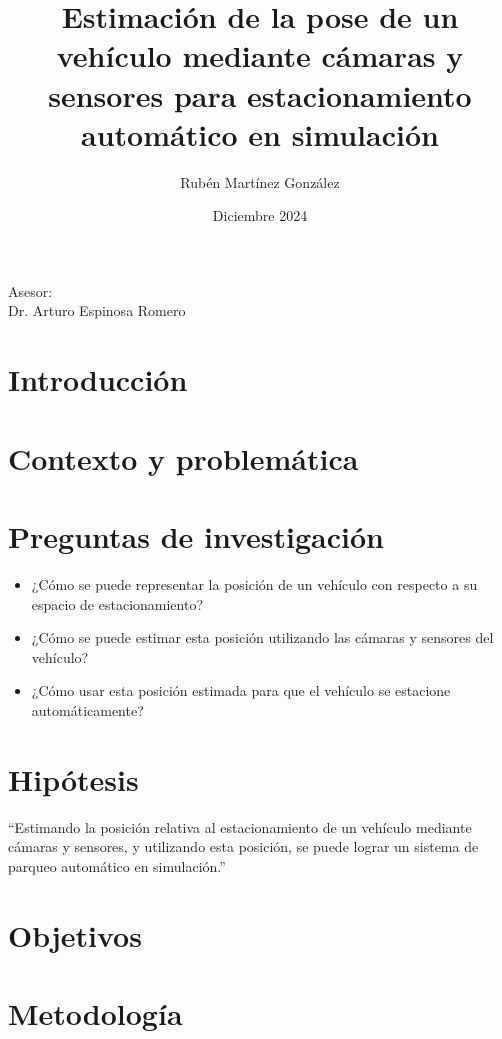 \documentclass[11pt,letterpaper,final]{article}
\title{Estimación de la pose de un vehículo mediante cámaras y sensores para estacionamiento automático en simulación}
\author{Rubén Martínez González}
\date{Diciembre 2024}
\begin{document}
    \maketitle
    \begin{center}
        Asesor: \\Dr. Arturo Espinosa Romero

    \end{center}
    \clearpage

    \section*{Introducción}
    
    \clearpage

    \section*{Contexto y problemática}
    
    \clearpage

    \section*{Preguntas de investigación}
    \begin{itemize}
        \item ¿Cómo se puede representar la posición de un vehículo con respecto a su espacio de estacionamiento?
        \item ¿Cómo se puede estimar esta posición utilizando las cámaras y sensores del vehículo?
        \item ¿Cómo usar esta posición estimada para que el vehículo se estacione automáticamente?
    \end{itemize}

    \section*{Hipótesis}
    \noindent
    ``Estimando la posición relativa al estacionamiento de un vehículo mediante cámaras y sensores,
    y utilizando esta posición, se puede lograr un sistema de parqueo automático en simulación.''

    \section*{Objetivos}
    
    \clearpage

    \section*{Metodología}
    \justify
    
\end{document}
